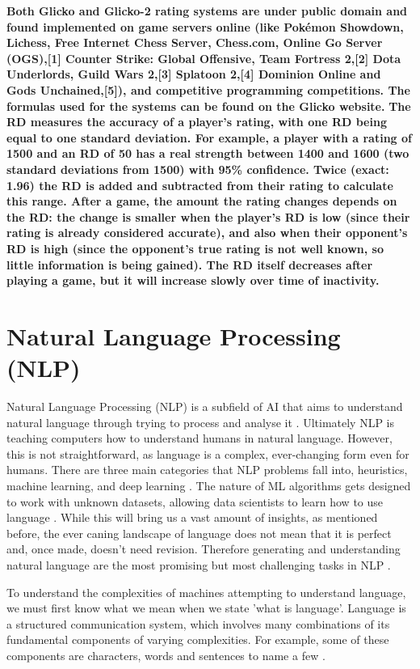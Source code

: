 	\textbf{Both Glicko and Glicko-2 rating systems are under public domain and found implemented on game servers online (like Pokémon Showdown, Lichess, Free Internet Chess Server, Chess.com, Online Go Server (OGS),[1] Counter Strike: Global Offensive, Team Fortress 2,[2] Dota Underlords, Guild Wars 2,[3] Splatoon 2,[4] Dominion Online and Gods Unchained,[5]), and competitive programming competitions. The formulas used for the systems can be found on the Glicko website.
	}
	\textbf{The RD measures the accuracy of a player's rating, with one RD being equal to one standard deviation. For example, a player with a rating of 1500 and an RD of 50 has a real strength between 1400 and 1600 (two standard deviations from 1500) with 95\% confidence. Twice (exact: 1.96) the RD is added and subtracted from their rating to calculate this range. After a game, the amount the rating changes depends on the RD: the change is smaller when the player's RD is low (since their rating is already considered accurate), and also when their opponent's RD is high (since the opponent's true rating is not well known, so little information is being gained). The RD itself decreases after playing a game, but it will increase slowly over time of inactivity.}
	
	
	\section{Natural Language Processing (NLP)}
	Natural Language Processing (NLP) is a subfield of AI that aims to understand natural language through trying to process and analyse it \cite{vasiliev2020natural, vajjala2020practical}. Ultimately NLP is teaching computers how to understand humans in natural language. However, this is not straightforward, as language is a complex, ever-changing form even for humans. There are three main categories that NLP problems fall into, heuristics, machine learning, and deep learning \cite{vajjala2020practical}. The nature of ML algorithms gets designed to work with unknown datasets, allowing data scientists to learn how to use language \cite{vasiliev2020natural}. While this will bring us a vast amount of insights, as mentioned before, the ever caning landscape of language does not mean that it is perfect and, once made, doesn't need revision. Therefore generating and understanding natural language are the most promising but most challenging tasks in NLP \cite{vasiliev2020natural, vajjala2020practical}.
	
	To understand the complexities of machines attempting to understand language, we must first know what we mean when we state 'what is language'. Language is a structured communication system, which involves many combinations of its fundamental components of varying complexities. For example, some of these components are characters, words and sentences to name a few \cite{vajjala2020practical}.
	
